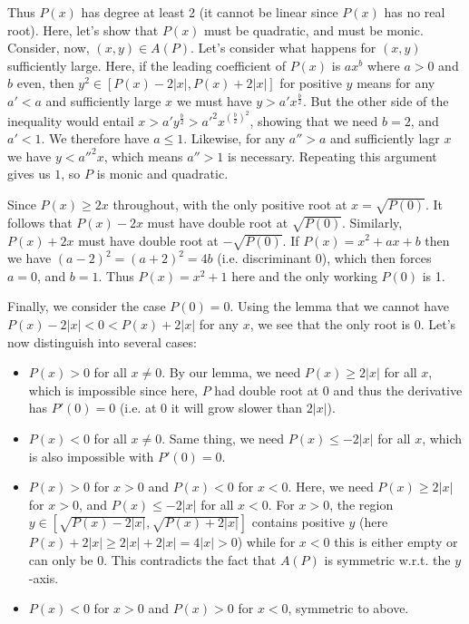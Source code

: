 \documentclass[11pt,a4paper]{article}
\begin{document}
\begin{enumerate}
	Thus $P(x)$ has degree at least 2 (it cannot be linear since $P(x)$ has no real root). 
	Here, let's show that $P(x)$ must be quadratic, and must be monic. 
	Consider, now, $(x, y)\in A(P)$. 
	Let's consider what happens for $(x, y)$ sufficiently large. 
	Here, if the leading coefficient of $P(x)$ is $ax^b$ where $a>0$ and $b$ even, 
	then $y^2\in [P(x)-2|x|, P(x)+2|x|]$ for positive $y$ means for any $a'<a$ and sufficiently large $x$ we must have $y > a'x^{\frac{b}{2}}$. But the other side of the inequality would entail 
	$x > a'y^{\frac{b}{2}} > a'^2 x^{(\frac{b}{2})^2}$, 
	showing that we need $b=2$, and $a' < 1$. We therefore have $a\le 1$. 
	Likewise, for any $a''>a$ and sufficiently lagr $x$ we have $y < a''^2x$, which means $a''>1$ is necessary. 
	Repeating this argument gives us $1$, so $P$ is monic and quadratic. 
	
	Since $P(x)\ge 2x$ throughout, with the only positive root at $x=\sqrt{P(0)}$. 
	It follows that $P(x)-2x$ must have double root at $\sqrt{P(0)}$. 
	Similarly, $P(x)+2x$ must have double root at $-\sqrt{P(0)}$. 
	If $P(x)=x^2+ax+b$ then we have $(a-2)^2=(a+2)^2=4b$ (i.e. discriminant 0), 
	which then forces $a=0$, and $b=1$. 
	Thus $P(x)=x^2+1$ here and the only working $P(0)$ is 1. 
	
	Finally, we consider the case $P(0)=0$. Using the lemma that we cannot have $P(x)-2|x| < 0 < P(x)+2|x|$ for any $x$, 
	we see that the only root is 0. 
	Let's now distinguish into several cases: 
	\begin{itemize}
		\item $P(x) > 0$ for all $x\neq 0$. 
		By our lemma, we need $P(x)\ge 2|x|$ for all $x$, which is impossible since here, $P$ had double root at 0 and thus the derivative has $P'(0)=0$ (i.e. at 0 it will grow slower than $2|x|$). 
		
		\item $P(x) < 0$ for all $x\neq 0$. 
		Same thing, we need $P(x) \le -2|x|$ for all $x$, which is also impossible with $P'(0)=0$. 
		
		\item $P(x) > 0$ for $x>0$ and $P(x)<0$ for $x<0$. 
		Here, we need $P(x)\ge 2|x|$ for $x>0$, and $P(x)\le -2|x|$ for all $x<0$. 
		For $x>0$, the region $y\in [\sqrt{P(x)-2|x|}, \sqrt{P(x)+2|x|}]$ contains positive $y$ 
		(here $P(x)+2|x|\ge 2|x|+2|x|=4|x|>0$)
		while for $x<0$ this is either empty or can only be 0. 
		This contradicts the fact that $A(P)$ is symmetric w.r.t. the $y$-axis. 
		
		\item $P(x) < 0$ for $x>0$ and $P(x)>0$ for $x<0$, symmetric to above. 
	\end{itemize}
\end{enumerate}
\end{document}
